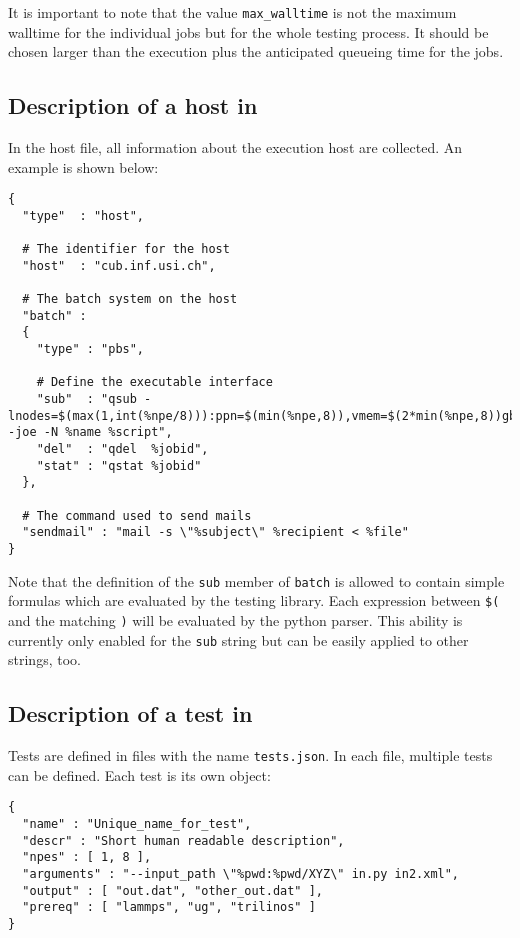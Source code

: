 It is important to note that the value \lstinline[style=SHELL]|max_walltime| is not the maximum walltime for the individual jobs but for the whole testing process. It should be chosen larger than the execution plus the anticipated queueing time for the jobs.

\subsection{Description of a host in \JSON}

In the host file, all information about the execution host are collected. An example is shown below:

\begin{lstlisting}[style=SHELL_SMALL,frame=lines]
{
  "type"  : "host",
  
  # The identifier for the host
  "host"  : "cub.inf.usi.ch",

  # The batch system on the host
  "batch" :
  {
    "type" : "pbs",

    # Define the executable interface
    "sub"  : "qsub -lnodes=$(max(1,int(%npe/8))):ppn=$(min(%npe,8)),vmem=$(2*min(%npe,8))gb,walltime=%wtime -joe -N %name %script",
    "del"  : "qdel  %jobid",
    "stat" : "qstat %jobid"
  },

  # The command used to send mails
  "sendmail" : "mail -s \"%subject\" %recipient < %file"
}
\end{lstlisting}

Note that the definition of the \lstinline[style=SHELL]|sub| member of \lstinline[style=SHELL]|batch| is allowed to contain simple formulas which are evaluated by the testing library. Each expression between \lstinline[style=SHELL]|$(| and the matching \lstinline[style=SHELL]|)| will be evaluated by the python parser. This ability is currently only enabled for the \lstinline[style=SHELL]|sub| string but can be easily applied to other strings, too. 

\subsection{Description of a test in \JSON}

Tests are defined in \JSON files with the name \lstinline[style=SHELL]|tests.json|. In each file, multiple tests can be defined. Each test is its own \JSON object:

\begin{lstlisting}[style=SHELL_SMALL,frame=lines]
{
  "name" : "Unique_name_for_test",
  "descr" : "Short human readable description",
  "npes" : [ 1, 8 ],
  "arguments" : "--input_path \"%pwd:%pwd/XYZ\" in.py in2.xml",
  "output" : [ "out.dat", "other_out.dat" ],
  "prereq" : [ "lammps", "ug", "trilinos" ]
}
\end{lstlisting}

